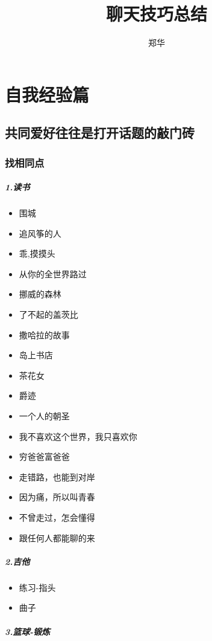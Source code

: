 \documentclass[UTF8,a4paper,8pt]{ctexbook}
\author{郑华}
\title{聊天技巧总结}
\begin{document}
 	\maketitle
 \chapter{自我经验篇}
 \section{共同爱好往往是打开话题的敲门砖}
	 \subsection{找相同点}
		 \paragraph{1.读书}
			 \begin{itemize}
			 	\item 围城
			 	\item 追风筝的人
			 	\item 乖,摸摸头
			 	\item 从你的全世界路过
			 	\item 挪威的森林
			 	\item 了不起的盖茨比
			 	\item 撒哈拉的故事
			 	\item 岛上书店
			 	\item 茶花女
			 	\item 爵迹
			 	\item 一个人的朝圣
			 	\item 我不喜欢这个世界，我只喜欢你
			 	\item 穷爸爸富爸爸
			 	\item 走错路，也能到对岸
			 	\item 因为痛，所以叫青春
			 	\item 不曾走过，怎会懂得
			 	\item 跟任何人都能聊的来
			 \end{itemize}
		 \paragraph{2.吉他}
			 \begin{itemize}
				 \item 练习-指头
				 \item 曲子
			 \end{itemize}
		 \paragraph{3.篮球-锻炼}
\end{document}
